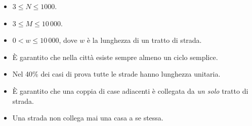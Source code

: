 \Constraints

\begin{itemize}[nolistsep, itemsep=2mm]
	\item $3 \le N \le 1000$.
	\item $3 \le M \le 10\,000$.
	\item $0 < w \le 10\,000$, dove $w$ è la lunghezza di un tratto di strada.
	\item È garantito che nella città esiste sempre almeno un ciclo semplice.
	\item Nel 40\% dei casi di prova tutte le strade hanno lunghezza unitaria.
	\item È garantito che una coppia di case adiacenti è collegata da \emph{un solo} tratto di strada.
	\item Una strada non collega mai una casa a se stessa.
\end{itemize}


\Examples

\begin{example}
%
\end{example}


\newpage
\begin{solution}
    
\end{solution}
